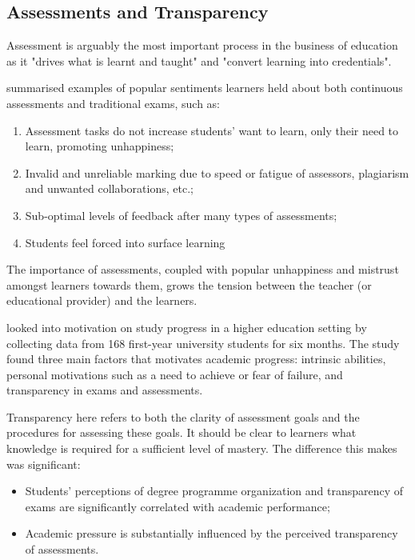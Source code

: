 \subsection{Assessments and Transparency}

Assessment is arguably the most important process in the business of education as it "drives what 
is learnt and taught" and "convert learning into credentials". \citep[p.160]{campbell2010digital}

\citet{brown1999assessment} summarised examples of popular sentiments learners held about both 
continuous assessments and traditional exams, such as:

\begin{enumerate}
    \item Assessment tasks do not increase students' want to learn, only their need to learn, promoting unhappiness;
    \item Invalid and unreliable marking due to speed or fatigue of assessors, plagiarism and unwanted collaborations, etc.;
    \item Sub-optimal levels of feedback after many types of assessments;
    \item Students feel forced into surface learning\\
    \citep[p.62-65]{brown1999assessment}
\end{enumerate}

The importance of assessments, coupled with popular unhappiness and mistrust amongst learners towards 
them, grows the tension between the teacher (or educational provider) and the learners.

\citet{suhre2013determinants} looked into motivation on study progress in a higher education setting by collecting data 
from 168 first-year university students for six months. The study found three main factors that motivates academic 
progress: intrinsic abilities, personal motivations such as a need to achieve or fear of failure, and transparency in 
exams and assessments.

Transparency here refers to both the clarity of assessment goals and the procedures for assessing these goals. 
It should be clear to learners what knowledge is required for a sufficient level of mastery. \citep{suhre2013determinants}
The difference this makes was significant:

\begin{itemize}
  \item Students' perceptions of degree programme organization and transparency of exams are 
  significantly correlated with academic performance;
  \item Academic pressure is substantially influenced by the perceived transparency of assessments.
\end{itemize}

